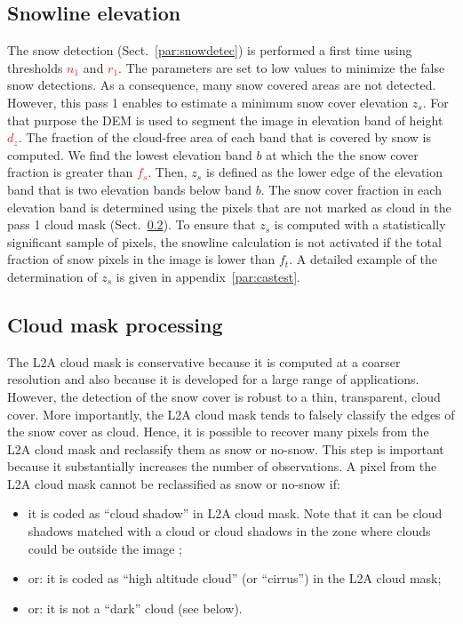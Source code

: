 \documentclass[a4paper]{article}
\begin{document}
\subsection{Snowline elevation}

The snow detection (Sect.~\ref{par:snowdetec}) is performed a first time using thresholds \textcolor{red}{$n_1$} and \textcolor{red}{$r_1$}. The parameters are set to low values to minimize the false snow detections. As a consequence, many snow covered areas are not detected. However, this pass 1 enables to estimate a minimum snow cover elevation $z_s$. For that purpose the DEM is used to segment the image in elevation band of height \textcolor{red}{$d_z$}. The fraction of the cloud-free area of each band that is covered by snow is computed. We find the lowest elevation band $b$ at which the the snow cover fraction is greater than \textcolor{red}{$f_s$}. Then, $z_s$ is defined as the lower edge of the elevation band that is two elevation bands below band $b$. The snow cover fraction in each elevation band is determined using the pixels that are not marked as cloud in the pass 1 cloud mask (Sect.~\ref{par:cloud}). To ensure that $z_s$ is computed with a statistically significant sample of pixels, the snowline calculation is not activated if the total fraction of snow pixels in the image is lower than $f_t$. A detailed example of the determination of $z_s$ is given in appendix~\ref{par:castest}.

\subsection{Cloud mask processing}\label{par:cloud}

The L2A cloud mask is conservative because it is computed at a coarser resolution and also because it is developed for a large range of applications. However, the detection of the snow cover is robust to a thin, transparent, cloud cover. More importantly, the L2A cloud mask tends to falsely classify the edges of the snow cover as cloud. Hence, it is possible to recover many pixels from the L2A cloud mask and reclassify them as snow or no-snow. This step is important because it substantially increases the number of observations. A pixel from the L2A cloud mask cannot be reclassified as snow or no-snow if:

\begin{itemize}
 \item it is coded as ``cloud shadow''  in L2A cloud mask. Note that it can be
   cloud shadows matched with a cloud or cloud shadows in the zone where clouds could be outside the image ;
 \item or: it is coded as ``high altitude cloud'' (or ``cirrus'') in the L2A cloud mask;
 \item or: it is not a ``dark'' cloud (see below).
\end{itemize}
\end{document}
